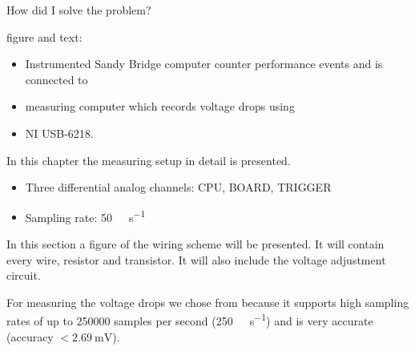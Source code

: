 \label{sec:design}

How did I solve the problem?



\label{sec:big-pic}

figure and text:

\begin{itemize}

\item Instrumented Sandy Bridge computer counter performance events and is 
      connected to

\item measuring computer which records voltage drops using

\item NI USB-6218.

\end{itemize}

\label{sec:measuring-setup}

In this chapter the measuring setup in detail is presented.



\begin{itemize}

\item Three differential analog channels: CPU, BOARD, TRIGGER

\item Sampling rate: \SI{50}{\kilo\samples\per\second}

\end{itemize}



In this section a figure of the wiring scheme will be presented. It will contain
every wire, resistor and transistor. It will also include the voltage adjustment
circuit.


\label{sec:measuring-device}

For measuring the voltage drops we chose
from  because it supports
high sampling rates of up to 250000 samples per second
(\SI{250}{\kilo\samples\per\second}) and is very
accurate (accuracy $< \SI{2.69}{\milli\volt}$)\cite{NISpec2009}.


